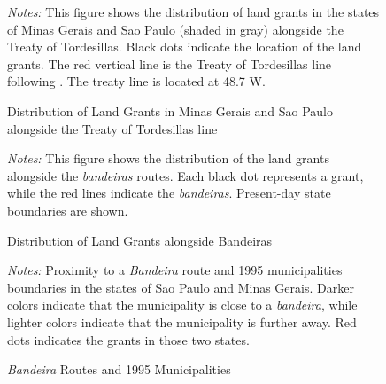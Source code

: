 \documentclass[11pt]{article}
\begin{document}
\begin{landscape}
\begin{figure}
  \caption{Distribution of Land Grants in Minas Gerais and Sao Paulo alongside the Treaty of Tordesillas line}
  \begin{center}
  \end{center}
  \textit{Notes:} This figure shows the distribution of land grants in the states of Minas Gerais and Sao Paulo (shaded in gray) alongside the Treaty of Tordesillas. Black dots indicate the location of the land grants. The red vertical line is the Treaty of Tordesillas line following \textcite{Laudares2022-vy}. The treaty line is located at 48.7 W.
  \label{fig:Tordesillas}
\end{figure}
\end{landscape}

\clearpage

\begin{figure}
  \caption{Distribution of Land Grants alongside Bandeiras}
  \begin{center}
  \end{center}
  \textit{Notes:} This figure shows the distribution of the land grants alongside the \textit{bandeiras} routes. Each black dot represents a grant, while the red lines indicate the \textit{bandeiras}. Present-day state boundaries are shown.
  \label{fig:Bandeiras}
\end{figure}

\begin{figure}[h!]
  \caption{\textit{Bandeira} Routes and 1995 Municipalities}
  \begin{center}
  \end{center}
  \textit{Notes:} Proximity to a \textit{Bandeira} route and 1995 municipalities boundaries in the states of Sao Paulo and Minas Gerais. Darker colors indicate that the municipality is close to a \textit{bandeira}, while lighter colors indicate that the municipality is further away. Red dots indicates the grants in those two states.
  \label{fig:bandeira_dist}
\end{figure}
\end{document}
